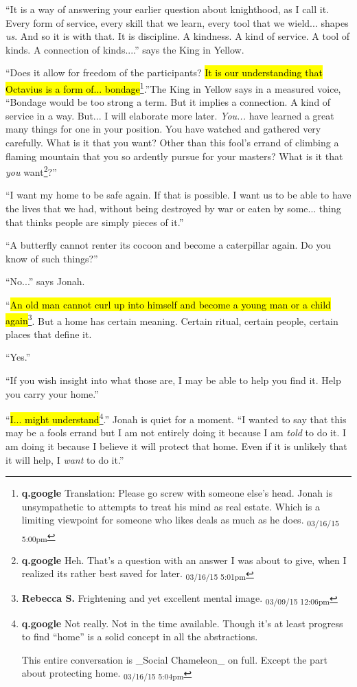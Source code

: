 ``It is a way of answering your earlier question about knighthood, as I call it. Every form of service, every skill that we learn, every tool that we wield... shapes \textit{us}.  And so it is with that.  It is discipline.  A kindness.  A kind of service.  A tool of kinds.  A connection of kinds....'' says the King in Yellow.

``Does it allow for freedom of the participants?  \hl{It is our understanding that Octavius is a form of... bondage}\footnote{\textbf{q.google }Translation: Please go screw with someone else's head.  Jonah is unsympathetic to attempts to treat his mind as real estate.  Which is a limiting viewpoint for someone who likes deals as much as he does. \textsubscript{03/16/15 5:00pm}}.''The King in Yellow says in a measured voice, ``Bondage would be too strong a term.  But it implies a connection.  A kind of service in a way.  But... I will elaborate more later.  \textit{You...} have learned a great many things for one in your position.  You have watched and gathered very carefully.  What is it that you want?  Other than this fool's errand of climbing a flaming mountain that you so ardently pursue for your masters?  What is it that \textit{you} want\footnote{\textbf{q.google }Heh.  That's a question with an answer I was about to give, when I realized its rather best saved for later. \textsubscript{03/16/15 5:01pm}}?''

``I want my home to be safe again.  If that is possible.  I want us to be able to have the lives that we had, without being destroyed by war or eaten by some... thing that thinks people are simply pieces of it.''

``A butterfly cannot renter its cocoon and become a caterpillar again.  Do you know of such things?''  

``No...'' says Jonah.

``\hl{An old man cannot curl up into himself and become a young man or a child again}\footnote{\textbf{Rebecca S. }Frightening and yet excellent mental image. \textsubscript{03/09/15 12:06pm}}. But a home has certain meaning.  Certain ritual, certain people, certain places that define it.

``Yes.''

``If you wish insight into what those are, I may be able to help you find it.  Help you carry your home.''

``\hl{I... might understand}\footnote{\textbf{q.google }Not really.  Not in the time available.  Though it's at least progress to find ``home'' is a solid concept in all the abstractions.

This entire conversation is \_Social Chameleon\_ on full.  Except the part about protecting home. \textsubscript{03/16/15 5:04pm}}.''  Jonah is quiet for a moment.  ``I wanted to say that this may be a fools errand but I am not entirely doing it because I am \textit{told} to do it.  I am doing it because I believe it will protect that home.  Even if it is unlikely that it will help, I \textit{want} to do it.''

